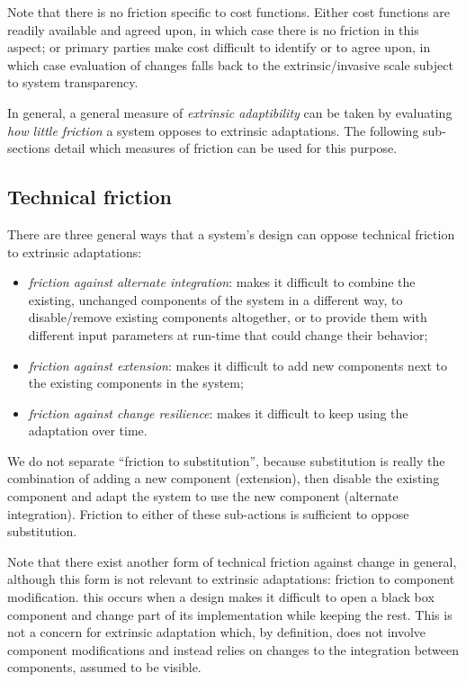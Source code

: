 \documentclass[a4paper]{article}
\begin{document}
Note that there is no friction specific to cost functions. Either cost
functions are readily available and agreed upon, in which case there
is no friction in this aspect; or primary parties make cost difficult
to identify or to agree upon, in which case evaluation of changes
falls back to the extrinsic/invasive scale subject to system
transparency.

In general, a general measure of \emph{extrinsic adaptibility} can be
taken by evaluating \emph{how little friction} a system opposes to
extrinsic adaptations.  The following sub-sections detail which
measures of friction can be used for this purpose.

\subsection{Technical friction}

There are three general ways that a system's design can oppose technical
friction to extrinsic adaptations:

\begin{itemize}
\item \emph{friction against alternate integration}: makes it difficult to
  combine the existing, unchanged components of the system in a
  different way, to disable/remove existing components altogether, or to
  provide them with different input parameters at run-time that could
  change their behavior;
\item \emph{friction against extension}: makes it difficult to add new
  components next to the existing components in the system;
\item \emph{friction against change resilience}: makes it difficult to keep
  using the adaptation over time.
\end{itemize}

We do not separate ``friction to substitution'', because substitution
is really the combination of adding a new component (extension), then
disable the existing component and adapt the system to use the new
component (alternate integration). Friction to either of these
sub-actions is sufficient to oppose substitution.

Note that there exist another form of technical friction against
change in general, although this form is not relevant to extrinsic
adaptations: friction to component modification. this occurs
when a design makes it difficult to open a black box component and
change part of its implementation while keeping the rest. This is not
a concern for extrinsic adaptation which, by definition, does not
involve component modifications and instead relies on changes to the
integration between components, assumed to be visible.
\end{document}
